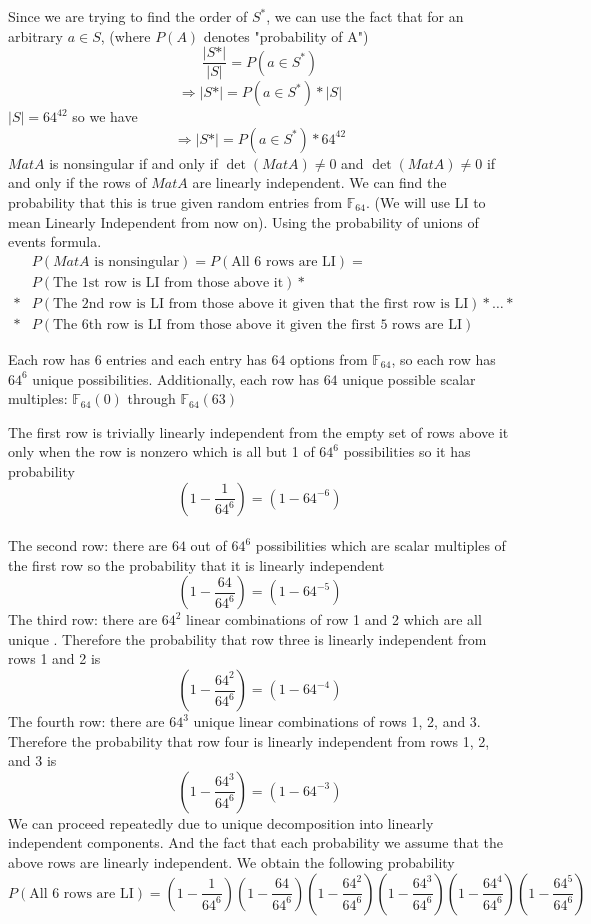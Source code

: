 \documentclass[12pt,letterpaper]{article}
\begin{document}
\begin{itemize}
        Since we are trying to find the order of $S^*$, we can use the fact that for an arbitrary $a\in S$, (where $P(A)$ denotes "probability of A")
        $$\frac{\lvert S*\rvert}{\lvert S\rvert}=P(a\in S^*)$$
        $$\Rightarrow \lvert S*\rvert = P(a\in S^*)*\lvert S\rvert$$
         $\lvert S\rvert = 64^{42}$ so we have
        \begin{equation}
            \Rightarrow \lvert S*\rvert = P(a\in S^*)*64^{42}    
        \end{equation}
        \newpage
        $MatA$ is nonsingular if and only if $\det(MatA) \not = 0$ and $\det(MatA) \not = 0$ if and only if the rows of $MatA$ are linearly independent. We can find the probability that this is true given random entries from $\mathbb{F}_{64}$. (We will use LI to mean Linearly Independent from now on). Using the probability of unions of events formula. \cite{Probability}
        \begin{align*}
            &P(MatA\text{ is nonsingular}) = P(\text{All 6 rows are LI})=\\ &P(\text{The 1st row is LI from those above it})*\\ *&P(\text{The 2nd row is LI from those above it given that the first row is LI})*\dots*\\ *&P(\text{The 6th row is LI from those above it given the first 5 rows are LI})
        \end{align*}
        
        Each row has $6$ entries and each entry has $64$ options from $\mathbb{F}_{64}$, so each row has $64^6$ unique possibilities. Additionally, each row has $64$ unique possible scalar multiples: $\mathbb{F}_{64}(0)$ through $\mathbb{F}_{64}(63)$ 
        
        The first row is trivially linearly independent from the empty set of rows above it only when the row is nonzero which is all but 1 of $64^{6}$ possibilities so it has probability $$(1-\frac{1}{64^6})=(1-64^{-6})$$\\
        The second row: there are $64$ out of $64^6$ possibilities which are scalar multiples of the first row so the probability that it is linearly independent $$(1-\frac{64}{64^6})=(1-64^{-5})$$
        The third row: there are $64^2$ linear combinations of row 1 and 2 which are all unique \cite{Apostols}. Therefore the probability that row three is linearly independent from rows 1 and 2 is $$(1-\frac{64^2}{64^6})=(1-64^{-4})$$
        The fourth row: there are $64^3$ unique linear combinations of rows 1, 2, and 3. Therefore the probability that row four is linearly independent from rows 1, 2, and 3 is $$(1-\frac{64^3}{64^6})=(1-64^{-3})$$
        We can proceed repeatedly due to unique decomposition into linearly independent components. And the fact that each probability we assume that the above rows are linearly independent.
        \newpage
        We obtain the following probability 
        \begin{equation}
            P(\text{All 6 rows are LI})=(1-\frac{1}{64^6})(1-\frac{64}{64^6})(1-\frac{64^2}{64^6})(1-\frac{64^3}{64^6})(1-\frac{64^4}{64^6})(1-\frac{64^5}{64^6})    
        \end{equation}
        

\end{itemize}
\end{document}

